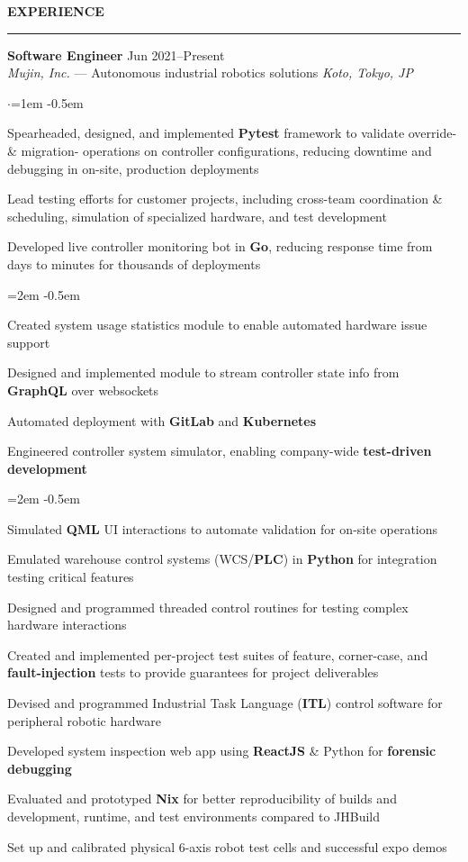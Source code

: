 \documentclass[10pt, a4paper]{article}
\newenvironment{aSection}[1]{
    \medskip \textbf{\uppercase{#1}}
    \smallskip
    \hrule
    \begin{list}{}{
            \setlength{\leftmargin}{1.5em}
        }
    \item[]
    }{
    \end{list}
}
\newenvironment{expSubsection}[4]{
    \textbf{#3} \hfill {#2} \\
    {#1} \hfill \textit{#4}
    \smallskip
    \begin{list}{$\cdot$}{\leftmargin=1em}
    \itemsep -0.5em \vspace{-0.5em}
    }{
    \end{list}
    \vspace{0.5em}
}
\newenvironment{subList}{
    \begin{list}{\raisebox{.4ex}{\tiny$\succ$}}{\leftmargin=2em}
    \itemsep -0.5em \vspace{-0.5em}
    }{
    \end{list}
}
\begin{document}
\begin{aSection}{Experience}
    \begin{expSubsection}
        {\textit{Mujin, Inc.} --- Autonomous industrial robotics solutions}
        {Jun 2021--Present}
        {Software Engineer}
        {Koto, Tokyo, JP}
    \item Spearheaded, designed, and implemented \textbf{Pytest} framework to validate override- \& migration-
        operations on controller configurations, reducing downtime and debugging in on-site, production deployments
    \item Lead testing efforts for customer projects, including cross-team coordination \& scheduling, simulation of
        specialized hardware, and test development
    \item Developed live controller monitoring bot in \textbf{Go}, reducing response time from days to minutes for
        thousands of deployments
        \begin{subList}
        \item Created system usage statistics module to enable automated hardware issue support
        \item Designed and implemented module to stream controller state info from \textbf{GraphQL} over websockets
        \item Automated deployment with \textbf{GitLab} and \textbf{Kubernetes}
        \end{subList}
    \item Engineered controller system simulator, enabling company-wide \textbf{test-driven development}
        \begin{subList}
        \item Simulated \textbf{QML} UI interactions to automate validation for on-site operations
        \item Emulated warehouse control systems (WCS/\textbf{PLC}) in \textbf{Python} for integration testing critical
            features
        \item Designed and programmed threaded control routines for testing complex hardware interactions
        \item Created and implemented per-project test suites of feature, corner-case, and \textbf{fault-injection}
            tests to provide guarantees for project deliverables
        \end{subList}
    \item Devised and programmed Industrial Task Language (\textbf{ITL}) control software for peripheral robotic
        hardware
    \item Developed system inspection web app using \textbf{ReactJS} \& Python for \textbf{forensic debugging}
    \item Evaluated and prototyped \textbf{Nix} for better reproducibility of builds and development, runtime, and test
        environments compared to JHBuild
    \item Set up and calibrated physical 6-axis robot test cells and successful expo demos
    \end{expSubsection}


\end{aSection}
\end{document}
